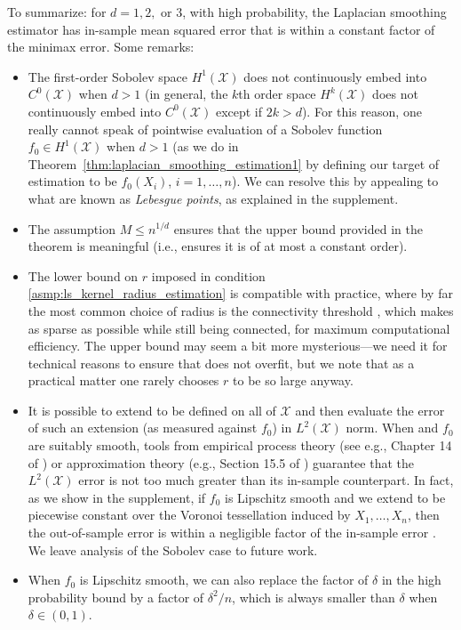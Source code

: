 \documentclass[twoside]{article}
\newcommand{\1}{\mathbf{1}}
\newcommand{\Xset}{\mathcal{X}}
\newcommand{\Leb}{L}
\newcommand{\wh}[1]{\widehat{#1}}
\theoremstyle{definition}
\theoremstyle{remark}
\begin{document}
To summarize: for $d = 1,2,$ or $3$, with high probability, the Laplacian smoothing estimator \smash{$\wh{f}$} has in-sample mean squared error that is within a constant factor of the minimax error. Some remarks:
\begin{itemize}
	\item The first-order Sobolev space $H^1(\Xset)$ does not continuously embed into $C^0(\Xset)$ when $d>1$ (in general, the $k$th order space $H^k(\Xset)$ does not continuously embed into $C^0(\Xset)$ except if $2k>d$). For this reason, one really cannot speak of pointwise evaluation of a Sobolev function $f_0 \in H^1(\Xset)$ when $d>1$ (as we do in Theorem~\ref{thm:laplacian_smoothing_estimation1} by defining our target of estimation to be $f_0(X_i)$, $i=1,\ldots,n$). We can resolve this by appealing to what are known as \emph{Lebesgue points}, as explained in the supplement.
	\item The assumption $M \leq n^{1/d}$ ensures that the upper bound provided in the theorem is meaningful (i.e., ensures it is of at most a constant order).
	\item The lower bound on $r$ imposed in condition \ref{asmp:ls_kernel_radius_estimation} is compatible with practice, where by far the most common choice of radius is the connectivity threshold , which makes  as sparse as possible while still being connected, for maximum computational efficiency. The upper bound may seem a bit more mysterious---we need it for technical reasons to ensure that \smash{$\wh{f}$} does not overfit, but we note that as a practical matter one rarely chooses $r$ to be so large anyway.
	\item It is possible to extend \smash{$\wh{f}$} to be defined on all of $\Xset$ and then evaluate the error of such an extension (as measured against $f_0$) in $\Leb^2(\Xset)$ norm. When \smash{$\wh{f}$} and $f_0$ are suitably smooth, tools from empirical process theory (see e.g., Chapter 14 of \citet{wainwright2019}) or approximation theory (e.g., Section 15.5 of \citet{johnstone2011}) guarantee that the $\Leb^2(\Xset)$ error is not too much greater than its in-sample counterpart. In fact, as we show in the supplement, if $f_0$ is Lipschitz smooth and we extend \smash{$\wh{f}$} to be piecewise constant over the Voronoi tessellation induced by $X_1,\ldots,X_n$, then the out-of-sample error \smash{$\|\wh{f}-f_0\|_{\Leb^2(\Xset)}$} is within a negligible factor of the in-sample error \smash{$\|\wh{f}-f_0\|_n$}. We leave analysis of the Sobolev case to future work.
	\item When $f_0$ is Lipschitz smooth, we can also replace the factor of $\delta$ in the high probability bound by a factor of $\delta^2/n$, which is always smaller than $\delta$ when $\delta \in (0,1)$.
\end{itemize} 
\end{document}
